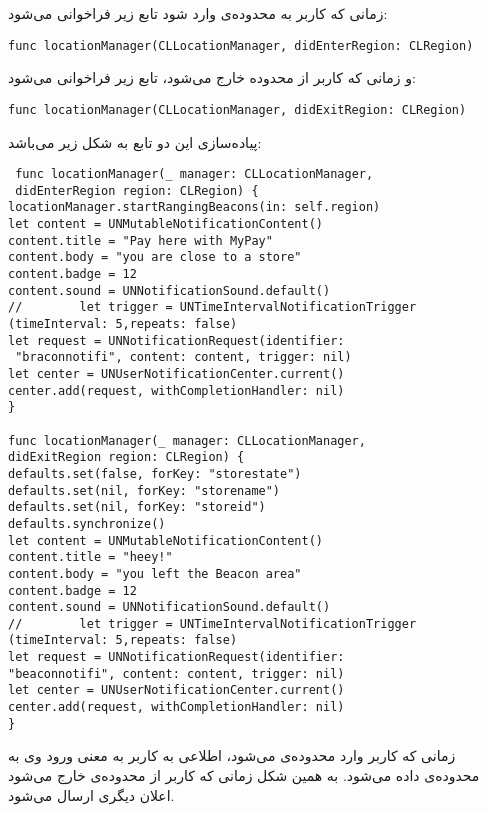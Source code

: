 \documentclass[oneside]{report}
\begin{document}
زمانی که کاربر به محدوده‌ی 
	{\normalsize {}}
	وارد شود تابع زیر فراخوانی می‌شود: 
	\begin{latin}
		\begin{verbatim}
func locationManager(CLLocationManager, didEnterRegion: CLRegion)
		\end{verbatim}
		
\end{latin}	
و زمانی که کاربر از محدوده خارج می‌شود، تابع زیر فراخوانی می‌شود: 
\begin{latin}
	\begin{verbatim}
func locationManager(CLLocationManager, didExitRegion: CLRegion)
	\end{verbatim}
\end{latin}	
	پیاده‌سازی این دو تابع به شکل زیر می‌باشد: 
	\begin{latin}
		\begin{verbatim}
 func locationManager(_ manager: CLLocationManager, 
 didEnterRegion region: CLRegion) {
locationManager.startRangingBeacons(in: self.region)
let content = UNMutableNotificationContent()
content.title = "Pay here with MyPay"
content.body = "you are close to a store"
content.badge = 12
content.sound = UNNotificationSound.default()
//        let trigger = UNTimeIntervalNotificationTrigger
(timeInterval: 5,repeats: false)
let request = UNNotificationRequest(identifier:
 "braconnotifi", content: content, trigger: nil)
let center = UNUserNotificationCenter.current()
center.add(request, withCompletionHandler: nil)
}

func locationManager(_ manager: CLLocationManager, 
didExitRegion region: CLRegion) {
defaults.set(false, forKey: "storestate")
defaults.set(nil, forKey: "storename")
defaults.set(nil, forKey: "storeid")
defaults.synchronize()
let content = UNMutableNotificationContent()
content.title = "heey!"
content.body = "you left the Beacon area"
content.badge = 12
content.sound = UNNotificationSound.default()
//        let trigger = UNTimeIntervalNotificationTrigger
(timeInterval: 5,repeats: false)
let request = UNNotificationRequest(identifier: 
"beaconnotifi", content: content, trigger: nil)
let center = UNUserNotificationCenter.current()
center.add(request, withCompletionHandler: nil)
}
		\end{verbatim}
	\end{latin}	
	زمانی که کاربر وارد محدوده‌ی 
		{\normalsize {}}
		می‌شود، اطلاعی به کاربر به معنی ورود وی به محدوده‌ی 
			{\normalsize {}}
			داده می‌شود. به همین شکل زمانی که کاربر از محدوده‌ی 
				{\normalsize {}}
				خارج می‌شود اعلان دیگری ارسال می‌شود. 
				
\end{document}
